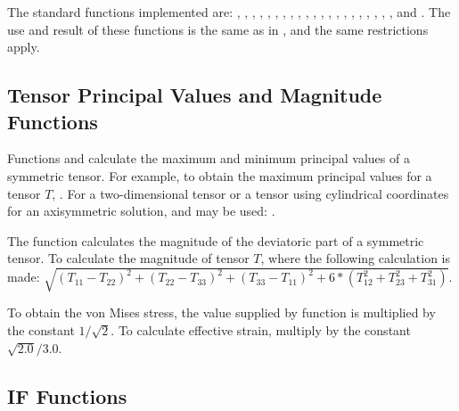 The standard  functions implemented are: ,
, , , , , ,
, , , , , ,
, , , , , ,
, , and . The use and result of these
functions is the same as in , and the same restrictions
apply.

\subsection*{Tensor Principal Values and Magnitude Functions}

Functions  and  calculate the maximum and minimum
principal values of a symmetric tensor. For example, to obtain the
maximum principal values for a tensor $T$,
\cenlinesbegin
{}.
\cenlinesend
For a two-dimensional tensor or a tensor using cylindrical coordinates
for an axisymmetric solution,  and  may be used:
\cenlinesbegin
{}.
\cenlinesend

The function  calculates the magnitude of the deviatoric part
of a symmetric tensor. To calculate the magnitude of tensor $T$,
\cenlinesbegin
{}
\cenlinesend
where the following calculation is made:
\cenlinesbegin
{}$\sqrt{(T_{11} - T_{22})^{2} + (T_{22} - T_{33})^{2} +
(T_{33} - T_{11})^{2} + 6 * (T_{12}^{2} + T_{23}^{2} + T_{31}^{2})}$.
\cenlinesend

To obtain the von Mises stress, the value supplied by function
 is multiplied by the constant $1/\sqrt{2}$. To calculate
effective strain, multiply by the constant $\sqrt{2.0}/3.0$.

\subsection*{IF Functions}

